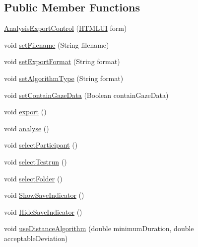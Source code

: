 \subsection*{Public Member Functions}
\begin{DoxyCompactItemize}
\item 
\hyperlink{class_web_analyzer_1_1_u_i_1_1_interaction_objects_1_1_analysis_export_control_a2425c39535e55e12f4ee4975a3176f23}{Analysis\+Export\+Control} (\hyperlink{class_web_analyzer_1_1_u_i_1_1_h_t_m_l_u_i}{H\+T\+M\+L\+U\+I} form)
\item 
void \hyperlink{class_web_analyzer_1_1_u_i_1_1_interaction_objects_1_1_analysis_export_control_ab99bfbf3692c2bf98659509acdd35dca}{set\+Filename} (String filename)
\item 
void \hyperlink{class_web_analyzer_1_1_u_i_1_1_interaction_objects_1_1_analysis_export_control_a905c7235a4fd676629321fd44716e6a9}{set\+Export\+Format} (String format)
\item 
void \hyperlink{class_web_analyzer_1_1_u_i_1_1_interaction_objects_1_1_analysis_export_control_ae48446e5cc2e80546f946109517b5321}{set\+Algorithm\+Type} (String format)
\item 
void \hyperlink{class_web_analyzer_1_1_u_i_1_1_interaction_objects_1_1_analysis_export_control_a3017c2cba0f0082ffdd7781751f8baf5}{set\+Contain\+Gaze\+Data} (Boolean contain\+Gaze\+Data)
\item 
void \hyperlink{class_web_analyzer_1_1_u_i_1_1_interaction_objects_1_1_analysis_export_control_aefc66bb4dc458b4ed4353eeb0b375275}{export} ()
\item 
void \hyperlink{class_web_analyzer_1_1_u_i_1_1_interaction_objects_1_1_analysis_export_control_a6696015a547f10cae60a7703c4ec1819}{analyse} ()
\item 
void \hyperlink{class_web_analyzer_1_1_u_i_1_1_interaction_objects_1_1_analysis_export_control_aa6c46c4213a2c07af6f40d6bc9fe7fdd}{select\+Participant} ()
\item 
void \hyperlink{class_web_analyzer_1_1_u_i_1_1_interaction_objects_1_1_analysis_export_control_a657be9be6841e03ea141377622cb50f1}{select\+Testrun} ()
\item 
void \hyperlink{class_web_analyzer_1_1_u_i_1_1_interaction_objects_1_1_analysis_export_control_adc83e194f06035232900d4a37ff5b7c5}{select\+Folder} ()
\item 
void \hyperlink{class_web_analyzer_1_1_u_i_1_1_interaction_objects_1_1_analysis_export_control_aacb447300e2c8656dd8dae25486e84e9}{Show\+Save\+Indicator} ()
\item 
void \hyperlink{class_web_analyzer_1_1_u_i_1_1_interaction_objects_1_1_analysis_export_control_ae0cebcc416faad0fc25e97969f567f59}{Hide\+Save\+Indicator} ()
\item 
void \hyperlink{class_web_analyzer_1_1_u_i_1_1_interaction_objects_1_1_analysis_export_control_a3ab30329d20435c760ac9c6e21a796d6}{use\+Distance\+Algorithm} (double minimum\+Duration, double acceptable\+Deviation)
\end{DoxyCompactItemize}
